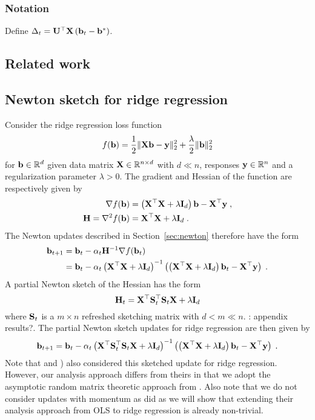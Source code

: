 \todo

\subsubsection{Notation}

Define $\Delta_t=\mathbf{U}^\top\mathbf{X}\left(\mathbf{b}_t-\mathbf{b}^*\right)$.

\subsection{Related work} \label{sec:literature}

\citet{Chowdhury:2018}

\citet{Wang:2017}

\citet{Cohen:2017}

\citet{Lacotte:2020}

\subsection{Newton sketch for ridge regression} \label{sec:ridgesketch}

Consider the ridge regression loss function
\[
f(\mathbf{b}) = \frac{1}{2}\|\mathbf{X}\mathbf{b}-\mathbf{y}\|_2^2 + \frac{\lambda}{2}\|\mathbf{b}\|_2^2
\]
for $\mathbf{b}\in\mathbb{R}^d$ given data matrix $\mathbf{X}\in\mathbb{R}^{n\times d}$ with $d\ll n$, responses $\mathbf{y}\in\mathbb{R}^n$ and a regularization parameter $\lambda>0$. The gradient and Hessian of the function are respectively given by
\begin{align*}
\nabla f(\mathbf{b}) &= \left(\mathbf{X}^\top\mathbf{X}+\lambda\mathbf{I}_d\right)\mathbf{b} - \mathbf{X}^\top\mathbf{y} \;, \\
\mathbf{H} = \nabla^2f(\mathbf{b}) &= \mathbf{X}^\top\mathbf{X}+\lambda\mathbf{I}_d \;.
\end{align*}
The Newton updates described in Section~\ref{sec:newton} therefore have the form
\begin{align*}
\mathbf{b}_{t+1} &= \mathbf{b}_t - \alpha_t\mathbf{H}^{-1}\nabla f(\mathbf{b}_t) \\
&= \mathbf{b}_t - \alpha_t\left(\mathbf{X}^\top\mathbf{X}+\lambda\mathbf{I}_d\right)^{-1}\left(\left(\mathbf{X}^\top\mathbf{X}+\lambda\mathbf{I}_d\right)\mathbf{b}_t-\mathbf{X}^\top\mathbf{y}\right) \;.
\end{align*}
A partial Newton sketch of the Hessian has the form
\[
\mathbf{H}_t = \mathbf{X}^\top\mathbf{S}_t^\top\mathbf{S}_t\mathbf{X} + \lambda\mathbf{I}_d
\]
where $\mathbf{S}_t$ is a $m\times n$ refreshed sketching matrix with $d<m\ll n$. \todo:\citet{Chowdhury:2018} appendix results?. The partial Newton sketch updates for ridge regression are then given by
\[
\mathbf{b}_{t+1} = \mathbf{b}_t - \alpha_t\left(\mathbf{X}^\top\mathbf{S}_t^\top\mathbf{S}_t\mathbf{X} + \lambda\mathbf{I}_d\right)^{-1}\left(\left(\mathbf{X}^\top\mathbf{X}+\lambda\mathbf{I}_d\right)\mathbf{b}_t-\mathbf{X}^\top\mathbf{y}\right) \;.
\]
Note that \citet{Chowdhury:2018} and \citet{Wang:2017}) also considered this sketched update for ridge regression. However, our analysis approach differs from theirs in that we adopt the asymptotic random matrix theoretic approach from \citet{Lacotte:2020}. Also note that we do not consider updates with momentum as \citet{Lacotte:2020} did as we will show that extending their analysis approach from OLS to ridge regression is already non-trivial.



